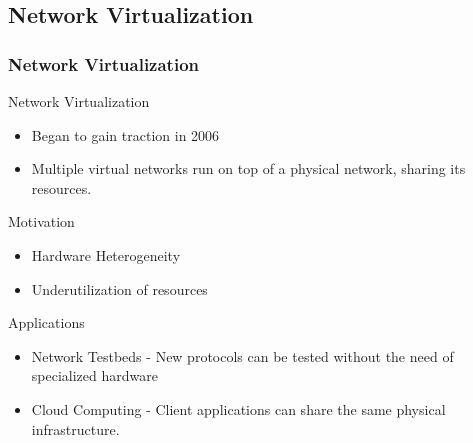 \documentclass[english]{beamer}
\begin{document}
\subsection{Network Virtualization}
\begin{frame}
  \frametitle{Network Virtualization}
\pause
Network Virtualization
\begin{itemize}
  \item Began to gain traction in 2006
  \item Multiple virtual networks run on top of a physical network, sharing its resources.
\end{itemize}
Motivation
\begin{itemize}
  \item Hardware Heterogeneity
  \item Underutilization of resources
\end{itemize}
Applications
\begin{itemize}
	\item Network Testbeds - New protocols can be tested without the need of 
     specialized hardware
	\item Cloud Computing - Client applications can share the same physical
      infrastructure.
\end{itemize}
\end{frame}
\end{document}

